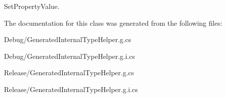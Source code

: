 SetPropertyValue. 



The documentation for this class was generated from the following files:\begin{DoxyCompactItemize}
\item 
Debug/GeneratedInternalTypeHelper.g.cs\item 
Debug/GeneratedInternalTypeHelper.g.i.cs\item 
Release/GeneratedInternalTypeHelper.g.cs\item 
Release/GeneratedInternalTypeHelper.g.i.cs\end{DoxyCompactItemize}
